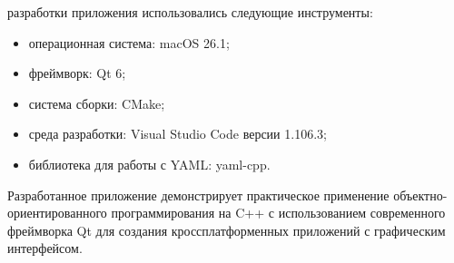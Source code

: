  разработки приложения использовались следующие инструменты:

\begin{itemize}
    \item операционная система: macOS 26.1;
    \item фреймворк: Qt 6;
    \item система сборки: CMake;
    \item среда разработки: Visual Studio Code версии 1.106.3;
    \item библиотека для работы с YAML: yaml-cpp.
\end{itemize}

Разработанное приложение демонстрирует практическое применение объектно-ориентированного программирования на C++ с использованием современного фреймворка Qt для создания кроссплатформенных приложений с графическим интерфейсом.
